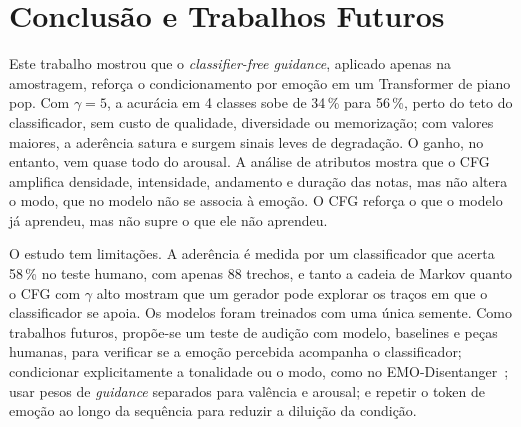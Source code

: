 \documentclass{article}
\begin{document}
\section{Conclusão e Trabalhos Futuros}\label{sec:conclusion}

Este trabalho mostrou que o \emph{classifier-free guidance}, aplicado apenas na
amostragem, reforça o condicionamento por emoção em um Transformer de piano pop.
Com $\gamma = 5$, a acurácia em 4 classes sobe de 34\,\% para 56\,\%, perto do
teto do classificador, sem custo de qualidade, diversidade ou memorização; com
valores maiores, a aderência satura e surgem sinais leves de degradação. O ganho,
no entanto, vem quase todo do arousal. A análise de atributos mostra que o CFG
amplifica densidade, intensidade, andamento e duração das notas, mas não altera
o modo, que no modelo não se associa à emoção. O CFG reforça o que o modelo já
aprendeu, mas não supre o que ele não aprendeu.

O estudo tem limitações. A aderência é medida por um classificador que acerta
58\,\% no teste humano, com apenas 88 trechos, e tanto a cadeia de Markov quanto o
CFG com $\gamma$ alto mostram que um gerador pode explorar os traços em que o
classificador se apoia. Os modelos foram treinados com uma única semente. Como trabalhos futuros, propõe-se um teste de audição com modelo,
baselines e peças humanas, para verificar se a emoção percebida acompanha o
classificador; condicionar explicitamente a tonalidade ou o modo, como no
EMO-Disentanger~\cite{Huang2024:emodisentanger}; usar pesos de \emph{guidance}
separados para valência e arousal; e repetir o token de emoção ao longo da
sequência para reduzir a diluição da condição.


\end{document}
